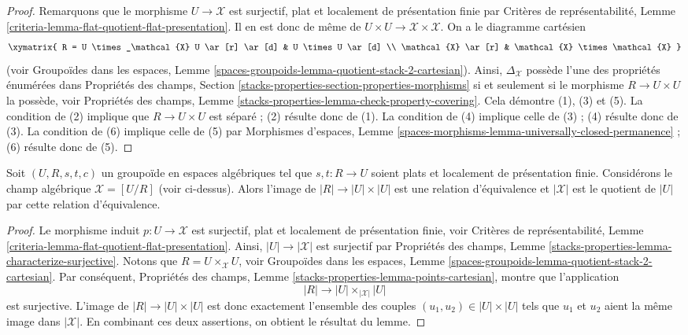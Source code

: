 \begin{proof}
Remarquons que le morphisme $U \to \mathcal{X}$ est surjectif, plat et
localement de présentation finie par Critères de représentabilité, Lemme
\ref{criteria-lemma-flat-quotient-flat-presentation}.
Il en est donc de même de
$U \times U \to \mathcal{X} \times \mathcal{X}$. On a le diagramme cartésien
$$
\xymatrix{
R  = U \times_\mathcal{X} U \ar[r] \ar[d] & U \times U \ar[d] \\
\mathcal{X} \ar[r] & \mathcal{X} \times \mathcal{X}
}
$$
(voir Groupoïdes dans les espaces, Lemme
\ref{spaces-groupoids-lemma-quotient-stack-2-cartesian}).
Ainsi, $\Delta_\mathcal{X}$ possède l'une des propriétés énumérées dans
Propriétés des champs, Section
\ref{stacks-properties-section-properties-morphisms}
si et seulement si le morphisme $R \to U \times U$ la possède, voir
Propriétés des champs, Lemme
\ref{stacks-properties-lemma-check-property-covering}.
Cela démontre (1), (3) et (5).
La condition de (2) implique que $R \to U \times U$ est séparé ; (2) résulte
donc de (1). La condition de (4) implique celle de (3) ; (4) résulte donc de
(3). La condition de (6) implique celle de (5) par Morphismes d'espaces, Lemme
\ref{spaces-morphisms-lemma-universally-closed-permanence} ; (6) résulte donc
de (5).
\end{proof}

\begin{lemma}
\label{lemma-points-presentation}
Soit $(U, R, s, t, c)$ un groupoïde en espaces algébriques tel que
$s, t : R \to U$ soient plats et localement de présentation finie.
Considérons le champ algébrique $\mathcal{X} = [U/R]$ (voir ci-dessus).
Alors l'image de $|R| \to |U| \times |U|$ est une relation d'équivalence et
$|\mathcal{X}|$ est le quotient de $|U|$ par cette relation d'équivalence.
\end{lemma}

\begin{proof}
Le morphisme induit $p : U \to \mathcal{X}$ est surjectif, plat et localement
de présentation finie, voir Critères de représentabilité, Lemme
\ref{criteria-lemma-flat-quotient-flat-presentation}.
Ainsi, $|U| \to |\mathcal{X}|$ est surjectif par Propriétés des champs, Lemme
\ref{stacks-properties-lemma-characterize-surjective}.
Notons que $R = U \times_\mathcal{X} U$, voir Groupoïdes dans les espaces,
Lemme \ref{spaces-groupoids-lemma-quotient-stack-2-cartesian}.
Par conséquent, Propriétés des champs,
Lemme \ref{stacks-properties-lemma-points-cartesian}, montre que l'application
$$
|R| \longrightarrow |U| \times_{|\mathcal{X}|} |U|
$$
est surjective. L'image de $|R| \to |U| \times |U|$ est donc exactement
l'ensemble des couples $(u_1, u_2) \in |U| \times |U|$ tels que $u_1$ et
$u_2$ aient la même image dans $|\mathcal{X}|$.
En combinant ces deux assertions, on obtient le résultat du lemme.
\end{proof}






